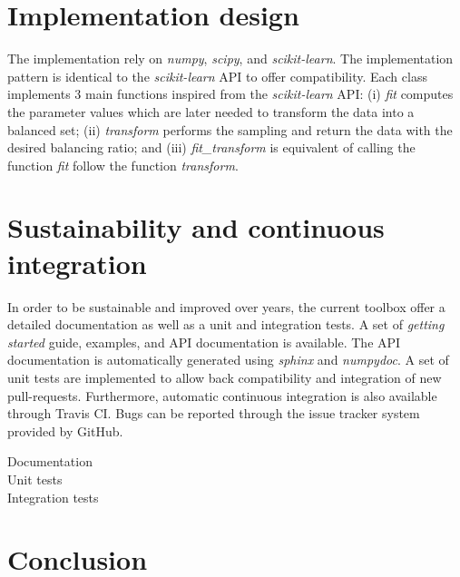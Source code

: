 \documentclass[twoside,11pt]{article}
\begin{document}
\section{Implementation design}

The implementation rely on \emph{numpy}, \emph{scipy}, and \emph{scikit-learn}.
The implementation pattern is identical to the \emph{scikit-learn} API to offer compatibility.
Each class implements 3 main functions inspired from the \emph{scikit-learn} API:
(i) \emph{fit} computes the parameter values which are later needed to transform the data into a balanced set;
(ii) \emph{transform} performs the sampling and return the data with the desired balancing ratio;
and (iii) \emph{fit\_transform} is equivalent of calling the function \emph{fit} follow the function \emph{transform}.

\section{Sustainability and continuous integration}

In order to be sustainable and improved over years, the current toolbox offer a detailed documentation as well as a unit and integration tests.
A set of \emph{getting started} guide, examples, and API documentation is available.
The API documentation is automatically generated using \emph{sphinx} and \emph{numpydoc}.
A set of unit tests are implemented to allow back compatibility and integration of new pull-requests.
Furthermore, automatic continuous integration is also available through Travis CI.
Bugs can be reported through the issue tracker system provided by GitHub.

\begin{description}
  \item[Documentation]
  \item[Unit tests]
  \item[Integration tests]
\end{description}

\section{Conclusion}


\end{document}
